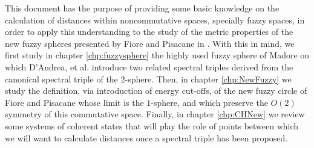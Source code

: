 This document has the purpose of providing some basic knowledge on the calculation of distances within noncommutative spaces, specially fuzzy spaces, in order to apply this understanding to the study of the metric properties of the new fuzzy spheres presented by Fiore and Pisacane in \cite{Fiore2018}. With this in mind, we first study in chapter \ref{chp:fuzzysphere} the highly used fuzzy sphere of Madore \cite{Madore} on which D'Andrea, et al. \cite{DAndrea2013} introduce two related spectral triples derived from the canonical spectral triple of the $2$-sphere. Then, in chapter \ref{chp:NewFuzzy} we study the definition, via introduction of energy cut-offs, of the new fuzzy circle of Fiore and Pisacane whose limit is the $1$-sphere, and which preserve the $O(2)$ symmetry of this commutative space. Finally, in chapter \ref{chp:CHNew} we review some systems of coherent states that will play the role of points between which we will want to calculate distances once a spectral triple has been proposed.



 
    
    
    
